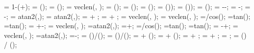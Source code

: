 {{		%
		\arrforceratio= 1-(\loadstartratio+\loadendratio);
		\loaddxa = \loaddxf*(\arrforceratio); %
		\loaddya = \loaddyf*(\arrforceratio); %
		\lena = veclen(\loaddxa, \loaddya);
		\loaddxaleft = \loaddxf*(\midratioleft); %
		\loaddyaleft = \loaddyf*(\midratioleft); %
		\lenaleft = \lenf*(\midratioleft);
		\loaddxaright = \loaddxf*(\midratioright)); %
		\loaddyaright = \loaddyf*(\midratioright)); %
		\lenaright = \lenf*(\midratioright);
		\lenamid = \lena-\lenaleft-\lenaright;
		\dahleft = \loadarrowheightmid-\loadarrowheightleft;
		\dahright = \loadarrowheightmid-\loadarrowheightright;
		\ldangleleft = atan2(\dahleft,\lenaleft);
		\ldangleright = atan2(\dahright,\lenaright);
		\totalangleleft = \loadangle + \ldangleleft;
		\totalangleright = \loadangle + \ldangleright;
		\totallengthleft = veclen(\lenaleft, \dahleft); %
		\totallengthright = veclen(\lenaright, \dahright); %
		\loadarrowlenleftnew=\loadarrowheightleft/cos(\extraangle);
		\loadarrowleftshifta=\loadarrowheightleft*tan(\extraangle);
		\loadarrowleftshiftb=\loadarrowheightmid*tan(\extraangle);
		\lenaleftshift= \lenaleft+\loadarrowleftshiftb-\loadarrowleftshifta;
		\totallengthleftnew = veclen(\lenaleftshift, \dahleft);
		\newangleleft=atan2(\dahleft,\lenaleftshift);
		\totalangleleftnew=\loadangle+\newangleleft;
		\loadarrowlenrightnew=\loadarrowheightright/cos(\extraangle);
		\loadarrowrightshifta=\loadarrowheightright*tan(\extraangle);
		\loadarrowrightshiftb=\loadarrowheightmid*tan(\extraangle);
		\lenarightshift= \lenaright-\loadarrowrightshiftb+\loadarrowrightshifta;
		\totallengthrightnew = veclen(\lenarightshift, \dahright);
		\newangleright=atan2(\dahright,\lenarightshift);
		\totalanglerightnew=\loadangle-\newangleright;
		\loadwxvalue = (\loaddxa)/(); %
		\loadwyvalue = (\loaddya)/(); %
		 = \loadstartcoordx + \loaddxf*(\loadstartratio);
		 = \loadstartcoordy + \loaddyf*(\loadstartratio);
		\loadxvalue{\loadarrownumber} =  + \loaddxa;
		\loadyvalue{\loadarrownumber} =  + \loaddya;
		\loadarrownumbermo = ;
		\arrlenratioleft = (\midratioleft) / (\arrforceratio);
}}
